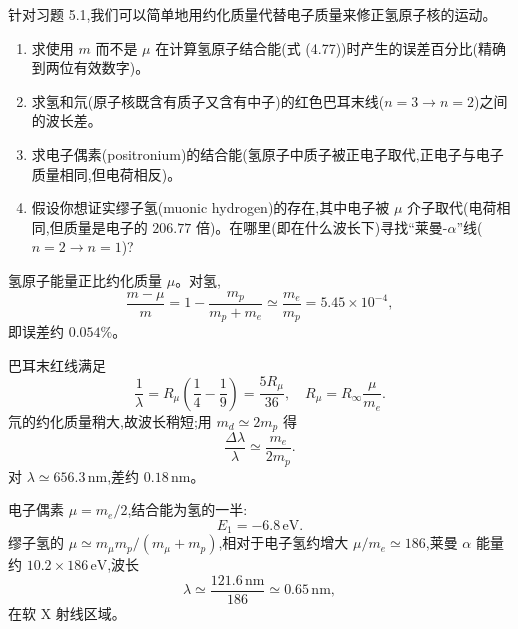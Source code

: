 \begin{question}
针对习题 5.1,我们可以简单地用约化质量代替电子质量来修正氢原子核的运动。
\begin{enumerate}
\item 求使用 $m$ 而不是 $\mu$ 在计算氢原子结合能(式 (4.77))时产生的误差百分比(精确到两位有效数字)。
\item 求氢和氘(原子核既含有质子又含有中子)的红色巴耳末线($n=3\to n=2$)之间的波长差。
\item 求电子偶素(positronium)的结合能(氢原子中质子被正电子取代,正电子与电子质量相同,但电荷相反)。
\item 假设你想证实缪子氢(muonic hydrogen)的存在,其中电子被 $\mu$ 介子取代(电荷相同,但质量是电子的 $206.77$ 倍)。在哪里(即在什么波长下)寻找“莱曼-$\alpha$”线($n=2\to n=1$)?
\end{enumerate}

\par\smallskip
{}

\begin{solution}

氢原子能量正比约化质量 $\mu$。对氢,
\[
\frac{m-
\mu}{m}=1-\frac{m_p}{m_p+m_e}\simeq \frac{m_e}{m_p}=5.45\times10^{-4},
\]
即误差约 $0.054\%$。

巴耳末红线满足
\[
\frac1\lambda=R_\mu\left(\frac14-\frac19\right)=\frac{5R_\mu}{36},
\quad R_\mu=R_\infty\frac{\mu}{m_e}.
\]
氘的约化质量稍大,故波长稍短;用 $m_d\simeq2m_p$ 得
\[
\frac{\Delta\lambda}{\lambda}\simeq \frac{m_e}{2m_p}.
\]
对 $\lambda\simeq656.3\,\mathrm{nm}$,差约 $0.18\,\mathrm{nm}$。

电子偶素 $\mu=m_e/2$,结合能为氢的一半:
\[
E_1=-6.8\,\mathrm{eV}.
\]
缪子氢的 $\mu\simeq m_\mu m_p/(m_\mu+m_p)$,相对于电子氢约增大 $\mu/m_e\simeq186$,莱曼 $\alpha$ 能量约 $10.2\times186\,\mathrm{eV}$,波长
\[
\lambda\simeq\frac{121.6\,\mathrm{nm}}{186}\simeq0.65\,\mathrm{nm},
\]
在软 X 射线区域。

\end{solution}
\end{question}


